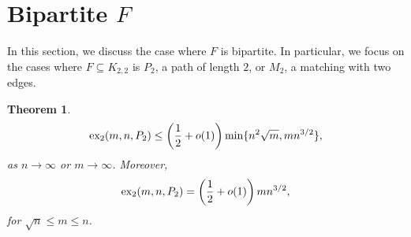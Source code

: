 \documentclass[12pt]{report}
\newtheorem{theorem}{Theorem}[chapter]
\newcommand*{\dex}{\textnormal{ex}_2}
\begin{document}
\section{Bipartite $F$}

In this section, we discuss the case where $F$ is bipartite. In particular, we focus on the cases where $F \subseteq K_{2, 2}$ is $P_2$, a path of length $2$, or $M_2$, a matching with two edges.

\begin{theorem}
  \[
    \dex(m, n, P_2) \leq \left(\frac{1}{2} + o(1)\right)\min\{n^{2}\sqrt{m}, mn^{3/2}\},
  \]
  as $n \to \infty$ or $m \to \infty$. Moreover, 
  \[
    \dex(m, n, P_2) = \left(\frac{1}{2} + o(1)\right)mn^{3/2},
  \]
  for $\sqrt{n} \leq m \leq n$.
\end{theorem}
\end{document}
